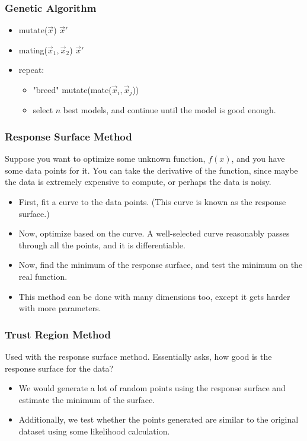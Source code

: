 \documentclass[10pt]{article}
\begin{document}
\subsubsection*{Genetic Algorithm}
\begin{itemize}
	\item mutate($\vec{x}$) \textrightarrow $\vec{x}'$
	\item mating($\vec{x}_1, \vec{x}_2$) \textrightarrow $\vec{x}'$
	\item repeat:
	\begin{itemize}
	    \item "breed" mutate(mate($\vec{x}_i, \vec{x}_j$))
	    \item select $n$ best models, and continue until the model is good enough.
    \end{itemize}
\end{itemize}

\subsubsection*{Response Surface Method}
Suppose you want to optimize some unknown function, $f(x)$, and you have some data points for it.  You can take the derivative of the function, since maybe the data is extremely expensive to compute, or perhaps the data is noisy.
\begin{itemize}
	\item First, fit a curve to the data points.  (This curve is known as the response surface.)
	\item Now, optimize based on the curve.  A well-selected curve reasonably passes through all the points, and it is differentiable.
	\item Now, find the minimum of the response surface, and test the minimum on the real function.
	\item This method can be done with many dimensions too, except it gets harder with more parameters.
\end{itemize}

\subsubsection*{Trust Region Method}
Used with the response surface method.  Essentially asks, how good is the response surface for the data?
\begin{itemize}
	\item We would generate a lot of random points using the response surface and estimate the minimum of the surface.
	\item Additionally, we test whether the points generated are similar to the original dataset using some likelihood calculation.
\end{itemize}
\end{document}

